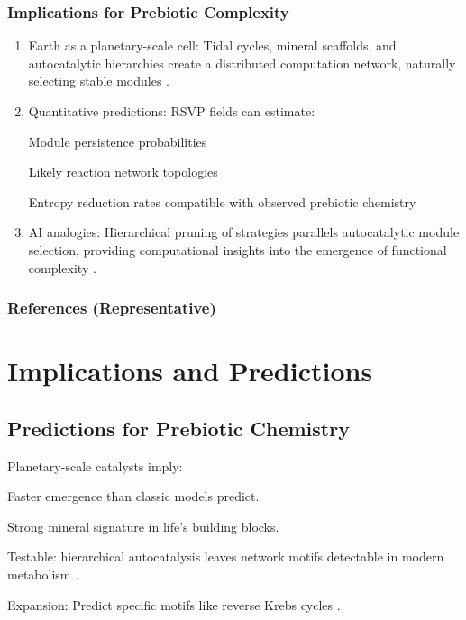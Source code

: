 \documentclass[openany]{book}
\begin{document}
\section{Implications for Prebiotic Complexity}
\begin{enumerate}
\item Earth as a planetary-scale cell: Tidal cycles, mineral scaffolds, and autocatalytic hierarchies create a distributed computation network, naturally selecting stable modules \citep{plum2025}.
\item Quantitative predictions: RSVP fields can estimate:

Module persistence probabilities

Likely reaction network topologies

Entropy reduction rates compatible with observed prebiotic chemistry \citep{sokolskyi2024}
\item AI analogies: Hierarchical pruning of strategies parallels autocatalytic module selection, providing computational insights into the emergence of functional complexity \citep{scalinghypothesis}.
\end{enumerate}

\section{References (Representative)}
\citep{hazen2005}

\citep{england2013}

\citep{walker2013}

\citep{endres2025}

\part{Implications and Predictions}

\chapter{Predictions for Prebiotic Chemistry}
Planetary-scale catalysts imply:

Faster emergence than classic models predict.

Strong mineral signature in life’s building blocks.

Testable: hierarchical autocatalysis leaves network motifs detectable in modern metabolism \citep{bao2022}.

Expansion: Predict specific motifs like reverse Krebs cycles \citep{muchowska2017}.
\end{document}
